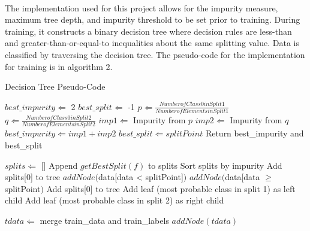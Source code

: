\documentclass[12pt]{article}
\begin{document}
    \paragraph{}
    The implementation used for this project allows for the impurity measure, maximum tree depth, and impurity threshold to be set prior to training. During training, it constructs a binary decision tree where decision rules are less-than and greater-than-or-equal-to inequalities about the same splitting value. Data is classified by traversing the decision tree. The pseudo-code for the implementation for training is in algorithm 2.
     \begin{algorithm} \label{DT}
    	\caption{Decision Tree Pseudo-Code}
    	\begin{algorithmic}
    		\State $best\_impurity \Leftarrow$ 2
    		\State $best\_split \Leftarrow$ -1
    		\State $p \Leftarrow \frac{Number of Class 0 in Split 1}{Number of Elements in Split 1}$
    		\State $q \Leftarrow \frac{Number of Class 0 in Split 2}{Number of Elements in Split 2}$
    		\State $imp1 \Leftarrow$ Impurity from $p$
    		\State $imp2 \Leftarrow$ Impurity from $q$
    		\State $best\_impurity \Leftarrow imp1 + imp2$
    		\State $best\_split \Leftarrow splitPoint$
    		\EndIf
    		\EndFor
    		\State Return best\_impurity and best\_split
    		\EndProcedure
    		
    		
    		\State $splits \Leftarrow$ []
    		\State Append $getBestSplit(f)$ to splits
    		\EndFor
    		\State Sort splits by impurity
    		\State Add splits[0] to tree
    		\State $addNode($data[data < splitPoint]$)$
    		\State $addNode($data[data $\ge$ splitPoint$)$
    		\Else
    		\State Add splits[0] to tree
    		\State Add leaf (most probable class in split 1) as left child
    		\State Add leaf (most probable class in split 2) as right child
    		\EndIf
       		\EndProcedure
    		
    		\State $tdata \Leftarrow$ merge train\_data and train\_labels	
    		\State $addNode(tdata)$
    		\EndProcedure
    	\end{algorithmic} 
    \end{algorithm}
\end{document}
